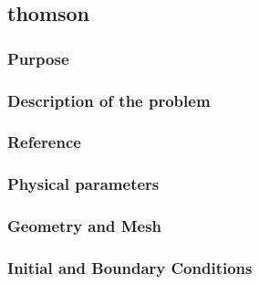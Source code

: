 \subsection{thomson}
%

%
\subsubsection{Purpose}
%

%
\subsubsection{Description of the problem}
%

%
%
\subsubsection{Reference}
%

%
%
\subsubsection{Physical parameters}
%

%
%
\subsubsection{Geometry and Mesh}
%

%
%
\subsubsection{Initial and Boundary Conditions}
%

%
%

